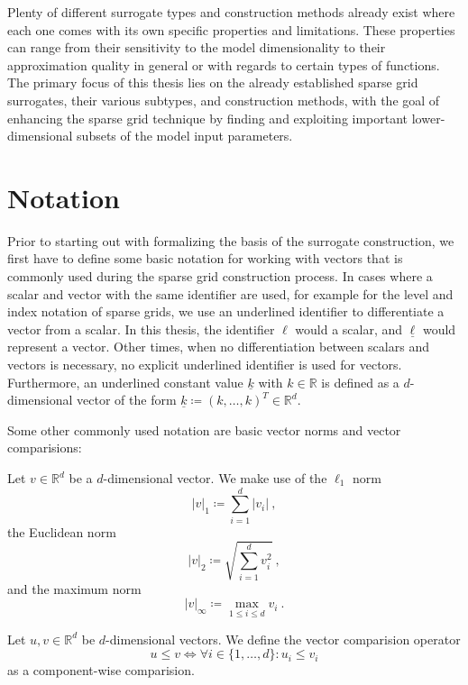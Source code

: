 \documentclass[
  a4paper,  %
  twoside,  %
  bibliography=totoc,
  headsepline,
  cleardoublepage=empty,
  parskip=half,
  draft=false
]{scrbook}
\begin{document}
Plenty of different surrogate types and construction methods already exist where each one comes with its own specific properties and limitations.
These properties can range from their sensitivity to the model dimensionality to their approximation quality in general or with regards to certain types of functions. 
The primary focus of this thesis lies on the already established sparse grid surrogates, their various subtypes, and construction methods, with the goal of enhancing the sparse grid technique by finding and exploiting important lower-dimensional subsets of the model input parameters.

\section{Notation}

Prior to starting out with formalizing the basis of the surrogate construction, we first have to define some basic notation for working with vectors that is commonly used during the sparse grid construction process.
In cases where a scalar and vector with the same identifier are used, for example for the level and index notation of sparse grids, we use an underlined identifier to differentiate a vector from a scalar.
In this thesis, the identifier $\ell$ would a scalar, and $\underline{\ell}$ would represent a vector.
Other times, when no differentiation between scalars and vectors is necessary, no explicit underlined identifier is used for vectors. 
Furthermore, an underlined constant value $\underline{k}$ with $k \in\mathds{R}$ is defined as a $d$-dimensional vector of the form $\underline{k} \coloneqq (k, \dots, k)^T \in \mathds{R}^d$.

Some other commonly used notation are basic vector norms and vector comparisions:
\begin{definition}
Let $v \in \mathds{R}^d$ be a $d$-dimensional vector.
We make use of the $\ell_1$ norm
\begin{equation}
|v|_1 \coloneqq \sum_{i=1}^d |v_i| ~,
\end{equation}
the Euclidean norm
\begin{equation}
|v|_2 \coloneqq \sqrt{\sum_{i=1}^d v_i^2} ~,
\end{equation}
and the maximum norm
\begin{equation}
|v|_\infty \coloneqq \max_{1 \leq i \leq d} v_i ~.
\end{equation}
\end{definition}
%
\begin{definition}
Let $u, v \in \mathds{R}^d$ be $d$-dimensional vectors.
We define the vector comparision operator
\begin{equation}
u \leq v \Leftrightarrow \forall i \in \{1,\dots,d\} \colon u_i \leq v_i
\end{equation}
as a component-wise comparision.
\end{definition}
\end{document}
